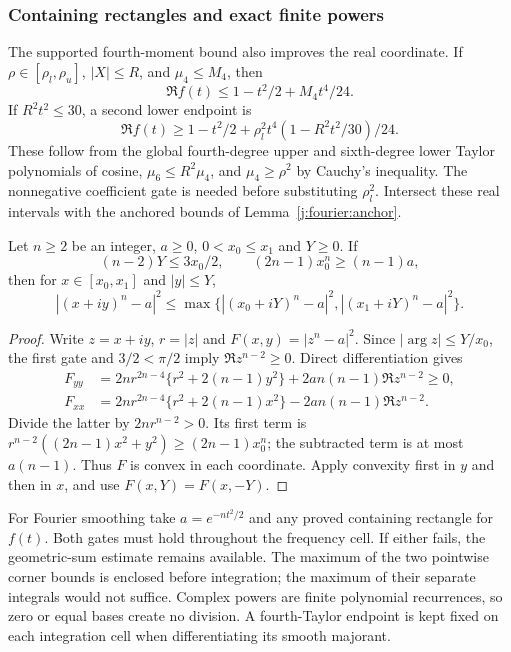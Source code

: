 \subsubsection{Containing rectangles and exact finite powers}
The supported fourth-moment bound also improves the real coordinate.
If $\rho\in[\rho_l,\rho_u]$, $|X|\le R$, and $\mu_4\le M_4$, then
\[
 \Re f(t)\le1-t^2/2+M_4t^4/24.
\]
If $R^2t^2\le30$, a second lower endpoint is
\[
 \Re f(t)\ge1-t^2/2
              +\rho_l^2t^4(1-R^2t^2/30)/24.
\]
These follow from the global fourth-degree upper and sixth-degree
lower Taylor polynomials of cosine, $\mu_6\le R^2\mu_4$, and
$\mu_4\ge\rho^2$ by Cauchy's inequality. The nonnegative coefficient
gate is needed before substituting $\rho_l^2$. Intersect these real
intervals with the anchored bounds of Lemma~\ref{j:fourier:anchor}.

\begin{lemma}
\label{j:finite:two-corners}
Let $n\ge2$ be an integer, $a\ge0$, $0<x_0\le x_1$ and $Y\ge0$.
If
\[
 (n-2)Y\le3x_0/2,\qquad (2n-1)x_0^n\ge(n-1)a,
\]
then for $x\in[x_0,x_1]$ and $|y|\le Y$,
\[
 |(x+iy)^n-a|^2
 \le\max\{|(x_0+iY)^n-a|^2,|(x_1+iY)^n-a|^2\}.
\]
\end{lemma}
\begin{proof}
Write $z=x+iy$, $r=|z|$ and $F(x,y)=|z^n-a|^2$.
Since $|\arg z|\le Y/x_0$, the first gate and $3/2<\pi/2$ imply
$\Re z^{n-2}\ge0$. Direct differentiation gives
\begin{align*}
 F_{yy}&=2nr^{2n-4}\{r^2+2(n-1)y^2\}
                         +2an(n-1)\Re z^{n-2}\ge0,\\
 F_{xx}&=2nr^{2n-4}\{r^2+2(n-1)x^2\}
                         -2an(n-1)\Re z^{n-2}.
\end{align*}
Divide the latter by $2nr^{n-2}>0$. Its first term is
$r^{n-2}((2n-1)x^2+y^2)\ge(2n-1)x_0^n$; the subtracted
term is at most $a(n-1)$. Thus $F$ is convex in each coordinate.
Apply convexity first in $y$ and then in $x$, and use
$F(x,Y)=F(x,-Y)$.
\end{proof}

For Fourier smoothing take $a=e^{-nt^2/2}$ and any proved containing
rectangle for $f(t)$. Both gates must hold throughout the frequency
cell. If either fails, the geometric-sum estimate remains available.
The maximum of the two pointwise corner bounds is enclosed before
integration; the maximum of their separate integrals would not suffice.
Complex powers are finite polynomial recurrences, so zero or equal
bases create no division. A fourth-Taylor endpoint is kept fixed on
each integration cell when differentiating its smooth majorant.

